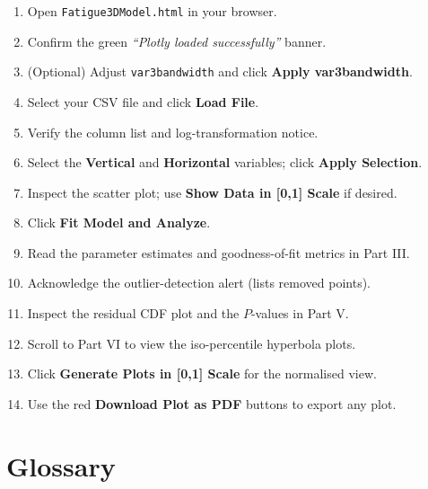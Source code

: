 \documentclass[12pt,a4paper]{article}
\begin{document}
\begin{enumerate}[leftmargin=1.5em, label=\textbf{\arabic*.}]
    \item Open \texttt{Fatigue3DModel.html} in your browser.
    \item Confirm the green \textit{``Plotly loaded successfully''} banner.
    \item (Optional) Adjust \texttt{var3bandwidth} and click \textbf{Apply var3bandwidth}.
    \item Select your CSV file and click \textbf{Load File}.
    \item Verify the column list and log-transformation notice.
    \item Select the \textbf{Vertical} and \textbf{Horizontal} variables; click
          \textbf{Apply Selection}.
    \item Inspect the scatter plot; use \textbf{Show Data in [0,1] Scale} if desired.
    \item Click \textbf{Fit Model and Analyze}.
    \item Read the parameter estimates and goodness-of-fit metrics in Part III.
    \item Acknowledge the outlier-detection alert (lists removed points).
    \item Inspect the residual CDF plot and the $P$-values in Part V.
    \item Scroll to Part VI to view the iso-percentile hyperbola plots.
    \item Click \textbf{Generate Plots in [0,1] Scale} for the normalised view.
    \item Use the red \textbf{Download Plot as PDF} buttons to export any plot.
\end{enumerate}

\section{Glossary}
\end{document}
